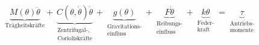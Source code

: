 \documentclass{article}
\begin{document}
	
\[
\underbrace{M(\theta)\ddot{\theta}}_{\mbox{Trägheitskräfte}} + \underbrace{C(\theta,\dot{\theta})\dot{\theta}}_{\begin{matrix}
	\mbox{Zentrifugal-,} \\ \mbox{Corioliskräfte} \end{matrix}}+\underbrace{g(\theta)}_{\begin{matrix}
	\mbox{Gravitations-} \\ \mbox{einfluss} \end{matrix}}+\underbrace{F\dot{\theta}}_{\begin{matrix}
	\mbox{Reibungs-} \\ \mbox{einfluss} \end{matrix}} + \underbrace{k{\theta}}_{\begin{matrix}
	\mbox{Feder-} \\ \mbox{kraft} \end{matrix}}=\underbrace{\tau}_{\begin{matrix}
	\mbox{Antriebs-} \\ \mbox{momente} \end{matrix}} 
\]
\end{document}
